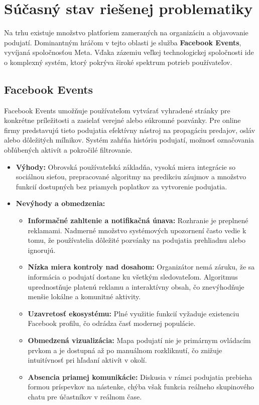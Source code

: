 \section{Súčasný stav riešenej problematiky}

Na trhu existuje množstvo platforiem zameraných na organizáciu a objavovanie podujatí. Dominantným hráčom v tejto oblasti je služba \textbf{Facebook Events}, vyvíjaná spoločnosťou Meta. Vďaka zázemiu veľkej technologickej spoločnosti ide o komplexný systém, ktorý pokrýva široké spektrum potrieb používateľov.

\subsection{Facebook Events}
Facebook Events umožňuje používateľom vytvárať vyhradené stránky pre konkrétne príležitosti a zasielať verejné alebo súkromné 
pozvánky.
Pre online firmy predstavujú tieto podujatia efektívny nástroj
na propagáciu predajov, osláv alebo dôležitých míľnikov. 
Systém zahŕňa históriu podujatí, možnosť označovania obľúbených aktivít a pokročilé filtrovanie.

\begin{itemize}[noitemsep]
    \item \textbf{Výhody:} Obrovská používateľská základňa, vysoká miera integrácie so sociálnou sieťou, 
    prepracované algoritmy na predikciu záujmov a množstvo funkcií dostupných bez priamych poplatkov za vytvorenie podujatia.
    \item \textbf{Nevýhody a obmedzenia:} 
    \begin{itemize}[noitemsep]
        \item \textbf{Informačné zahltenie a notifikačná únava:} Rozhranie je preplnené reklamami. Nadmerné množstvo systémových upozornení
         často vedie k tomu, že používatelia dôležité pozvánky na podujatia prehliadnu alebo ignorujú.
        \item \textbf{Nízka miera kontroly nad dosahom:} Organizátor nemá záruku, že sa informácia o podujatí dostane ku všetkým sledovateľom.
         Algoritmus uprednostňuje platenú reklamu a interaktívny obsah, čo znevýhodňuje menšie lokálne a komunitné aktivity.
        \item \textbf{Uzavretosť ekosystému:} Plné využitie funkcií vyžaduje existenciu Facebook profilu, čo odrádza časť modernej populácie.
        \item \textbf{Obmedzená vizualizácia:} Mapa podujatí nie je primárnym ovládacím prvkom a je dostupná až po manuálnom rozkliknutí, 
        čo znižuje intuitívnosť pri hľadaní aktivít v okolí.
        \item \textbf{Absencia priamej komunikácie:} Diskusia v rámci podujatia prebieha formou príspevkov na nástenke,
         chýba však funkcia reálneho skupinového chatu pre účastníkov v reálnom čase.
    \end{itemize}
\end{itemize} \cite{facebook_events, bigcommerce_facebook_events , stewart2020facebook}

